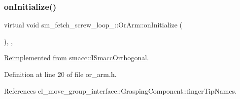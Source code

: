 \subsubsection{\texorpdfstring{on\+Initialize()}{onInitialize()}}
{\footnotesize\ttfamily virtual void sm\+\_\+fetch\+\_\+screw\+\_\+loop\+\_\+::\+Or\+Arm\+::on\+Initialize (\begin{DoxyParamCaption}{ }\end{DoxyParamCaption})\hspace{0.3cm}{\ttfamily [inline]}, {\ttfamily [override]}, {\ttfamily [virtual]}}



Reimplemented from \hyperlink{classsmacc_1_1ISmaccOrthogonal_a6bb31c620cb64dd7b8417f8705c79c7a}{smacc\+::\+I\+Smacc\+Orthogonal}.



Definition at line 20 of file or\+\_\+arm.\+h.



References cl\+\_\+move\+\_\+group\+\_\+interface\+::\+Grasping\+Component\+::finger\+Tip\+Names.


